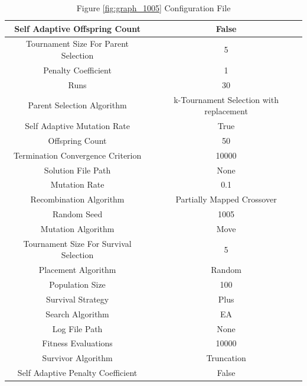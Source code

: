 \documentclass{standalone}
\begin{document}
\begin{table}[!htb]
	\centering
	\caption{Figure \ref{fig:graph_1005} Configuration File}
	\label{tab:graph_1005}
	\begin{tabular}{| c | c |}
		\hline
		Self Adaptive Offspring Count		& False		 \\
		\hline
		Tournament Size For Parent Selection		& 5		 \\
		\hline
		Penalty Coefficient		& 1		 \\
		\hline
		Runs		& 30		 \\
		\hline
		Parent Selection Algorithm		& k-Tournament Selection with replacement		 \\
		\hline
		Self Adaptive Mutation Rate		& True		 \\
		\hline
		Offspring Count		& 50		 \\
		\hline
		Termination Convergence Criterion		& 10000		 \\
		\hline
		Solution File Path		& None		 \\
		\hline
		Mutation Rate		& 0.1		 \\
		\hline
		Recombination Algorithm		& Partially Mapped Crossover		 \\
		\hline
		Random Seed		& 1005		 \\
		\hline
		Mutation Algorithm		& Move		 \\
		\hline
		Tournament Size For Survival Selection		& 5		 \\
		\hline
		Placement Algorithm		& Random		 \\
		\hline
		Population Size		& 100		 \\
		\hline
		Survival Strategy		& Plus		 \\
		\hline
		Search Algorithm		& EA		 \\
		\hline
		Log File Path		& None		 \\
		\hline
		Fitness Evaluations		& 10000		 \\
		\hline
		Survivor Algorithm		& Truncation		 \\
		\hline
		Self Adaptive Penalty Coefficient		& False		 \\
		\hline
	\end{tabular}
\end{table}
\end{document}
